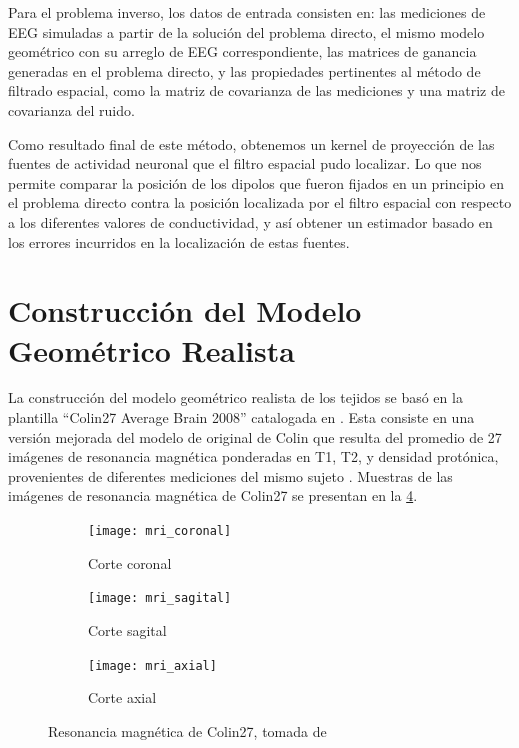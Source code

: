 Para el problema inverso, los datos de entrada consisten en: las mediciones de EEG simuladas a partir de la solución del problema directo, el mismo modelo geométrico con su arreglo de EEG correspondiente, las matrices de ganancia generadas en el problema directo, y las propiedades pertinentes al método de filtrado espacial, como la matriz de covarianza de las mediciones y una matriz de covarianza del ruido.

Como resultado final de este método, obtenemos un kernel de proyección de las fuentes de actividad neuronal que el filtro espacial pudo localizar.
Lo que nos permite comparar la posición de los dipolos que fueron fijados en un principio en el problema directo contra la posición localizada por el filtro espacial con respecto a los diferentes valores de conductividad, y así obtener un estimador basado en los errores incurridos en la localización de estas fuentes.

\section{Construcción del Modelo Geométrico Realista}
\label{sec:methodology:model}

La construcción del modelo geométrico realista de los tejidos se basó en la plantilla ``Colin27 Average Brain 2008'' catalogada en \cite{Aubert-Broche2006}.
Esta consiste en una versión mejorada del modelo de original de Colin que resulta del promedio de 27 imágenes de resonancia magnética ponderadas en T1, T2, y densidad protónica, provenientes de diferentes mediciones del mismo sujeto \cite{Collins1998, Holmes1998}. 
Muestras de las imágenes de resonancia magnética de Colin27 se presentan en la \cref{fig:methodology:mri}.

\begin{figure}[tb]
	\centering
	\begin{subfigure}{0.49\textwidth}
		\centering
		\texttt{[image: mri\_coronal]}
		\caption{Corte coronal}
		\label{fig:methodology:coronal}
		\vspace{0.1cm} %
	\end{subfigure}
	\begin{subfigure}{0.49\textwidth}
		\centering
		\texttt{[image: mri\_sagital]}
		\caption{Corte sagital}
		\label{fig:methodology:sagital}
		\vspace{0.1cm} %
	\end{subfigure}
	\begin{subfigure}{0.49\textwidth}
		\centering
		\texttt{[image: mri\_axial]}
		\caption{Corte axial}
		\label{fig:methodology:axial}
	\end{subfigure}
	\caption{Resonancia magnética de Colin27, tomada de \cite{Aubert-Broche2006}}
	\label{fig:methodology:mri}
\end{figure}

